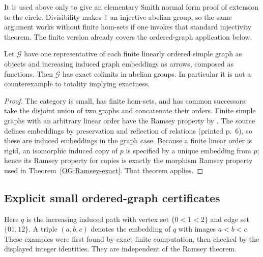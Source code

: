 \begin{remark}\label{OG:finite-hom-scope}
It is used above only to give an elementary Smith normal form proof
of extension to the circle. Divisibility makes $\mathbb T$ an injective
abelian group, so the same argument works without finite hom-sets if
one invokes that standard injectivity theorem. The finite version
already covers the ordered-graph application below.
\end{remark}

\begin{corollary}
\label{OG:exact}
Let $\mathcal G$ have one representative of each finite linearly
ordered simple graph as objects and increasing induced graph
embeddings as arrows, composed as functions. Then $\mathcal G$ has
exact colimits in abelian groups. In particular it is not a
counterexample to totality implying exactness.
\end{corollary}
\begin{proof}
The category is small, has finite hom-sets, and has common successors:
take the disjoint union of two graphs and concatenate their orders.
Finite simple graphs with an arbitrary linear order have the Ramsey
property by \cite[Corollary~4.3, printed p.~51]{HubickaNesetril2019}.
The source defines embeddings by preservation and reflection of
relations (printed p.~6), so these are induced embeddings in the graph
case. Because a finite linear order is rigid, an isomorphic induced
copy of $p$ is specified by a unique embedding from $p$; hence its
Ramsey property for copies is exactly the morphism Ramsey property
used in Theorem~\ref{OG:Ramsey-exact}. That theorem applies.
\end{proof}

\subsection{Explicit small ordered-graph certificates}

Here $q$ is the increasing induced path with vertex set
$\{0<1<2\}$ and edge set $\{01,12\}$. A triple $(a,b,c)$ denotes
the embedding of $q$ with images $a<b<c$. These examples were first
found by exact finite computation, then checked by the displayed
integer identities. They are independent of the Ramsey theorem.

